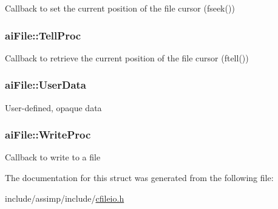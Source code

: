 Callback to set the current position of the file cursor (fseek()) \hypertarget{structai_file_aaf2d88a3b2fcbdacf51119658283d27e}{
\subsubsection[{Tell\-Proc}]{ ai\-File\-::\-Tell\-Proc}}\label{structai_file_aaf2d88a3b2fcbdacf51119658283d27e}
Callback to retrieve the current position of the file cursor (ftell()) \hypertarget{structai_file_aec528fa18f4755fe4f28d604fde28aad}{
\subsubsection[{User\-Data}]{ ai\-File\-::\-User\-Data}}\label{structai_file_aec528fa18f4755fe4f28d604fde28aad}
User-\/defined, opaque data \hypertarget{structai_file_ab9fca3a62e34a33592c13a6f31db7d1d}{
\subsubsection[{Write\-Proc}]{ ai\-File\-::\-Write\-Proc}}\label{structai_file_ab9fca3a62e34a33592c13a6f31db7d1d}
Callback to write to a file 

The documentation for this struct was generated from the following file\-:\begin{DoxyCompactItemize}
\item 
include/assimp/include/\hyperlink{cfileio_8h}{cfileio.\-h}\end{DoxyCompactItemize}
